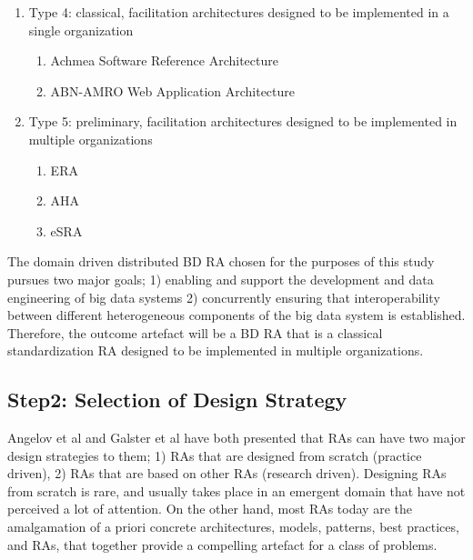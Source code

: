 \documentclass[review]{elsarticle}
\begin{document}
\begin{enumerate}
\begin{enumerate}
        \item Type 4: classical, facilitation architectures designed to be implemented in a single organization
        \begin{enumerate}
            \item Achmea Software Reference Architecture   \cite{greefhorst2006achmea}
            \item ABN-AMRO Web Application Architecture \cite{greefhorst1999een}
        \end{enumerate}
        
        \item Type 5: preliminary, facilitation architectures designed to be implemented in multiple organizations
        \begin{enumerate}
            \item ERA   \cite{angelov2008contracting}
            \item AHA   \cite{wu2002reference}
            \item eSRA  \cite{norta2007exploring} 
        \end{enumerate}
    \end{enumerate}
  \end{enumerate}

The domain driven distributed BD RA chosen for the purposes of this study pursues two major goals; 1) enabling and support the development and data engineering of big data systems 2) concurrently ensuring that interoperability between different heterogeneous components of the big data system is established. Therefore, the outcome artefact will be a BD RA that is a classical standardization RA designed to be implemented in multiple organizations. 

\subsection{Step2: Selection of Design Strategy}

Angelov et al \cite{angelov2008towards} and Galster et al\cite{galster2011empirically} have both presented that RAs can have two major design strategies to them; 1) RAs that are designed from scratch (practice driven), 2) RAs that are based on other RAs (research driven). Designing RAs from scratch is rare, and usually takes place in an emergent domain that have not perceived a lot of attention. On the other hand, most RAs today are the amalgamation of a priori concrete architectures, models, patterns, best practices, and RAs, that together provide a compelling artefact for a class of problems.  
\end{document}
